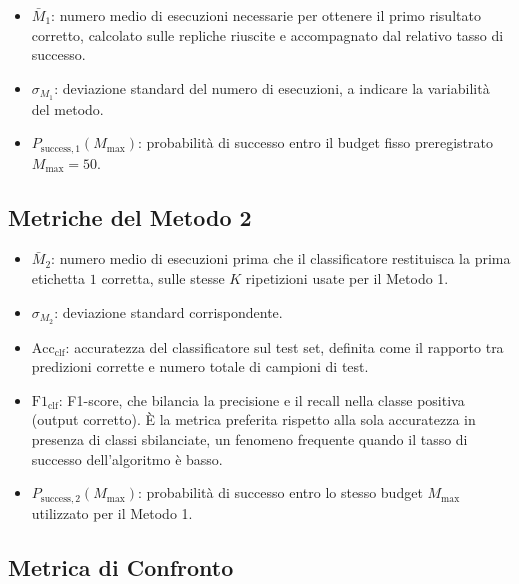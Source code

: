 \begin{onehalfspace}
\begin{itemize}
    \item $\bar{M}_1$: numero medio di esecuzioni necessarie per ottenere il primo risultato corretto, calcolato sulle repliche riuscite e accompagnato dal relativo tasso di successo.
    \item $\sigma_{M_1}$: deviazione standard del numero di esecuzioni, a indicare la variabilità del metodo.
    \item $P_{\text{success},1}(M_{\text{max}})$: probabilità di successo entro il budget fisso preregistrato $M_{\text{max}}=50$.
\end{itemize}

\subsection{Metriche del Metodo 2}

\begin{itemize}
    \item $\bar{M}_2$: numero medio di esecuzioni prima che il classificatore restituisca la prima etichetta $1$ corretta, sulle stesse $K$ ripetizioni usate per il Metodo 1.
    \item $\sigma_{M_2}$: deviazione standard corrispondente.
    \item $\text{Acc}_{\text{clf}}$: accuratezza del classificatore sul test set, definita come il rapporto tra predizioni corrette e numero totale di campioni di test.
    \item $\text{F1}_{\text{clf}}$: F1-score, che bilancia la precisione e il recall nella classe positiva (output corretto). È la metrica preferita rispetto alla sola accuratezza in presenza di classi sbilanciate, un fenomeno frequente quando il tasso di successo dell'algoritmo è basso.
    \item $P_{\text{success},2}(M_{\text{max}})$: probabilità di successo entro lo stesso budget $M_{\text{max}}$ utilizzato per il Metodo 1.
\end{itemize}

\subsection{Metrica di Confronto}


\end{onehalfspace}
